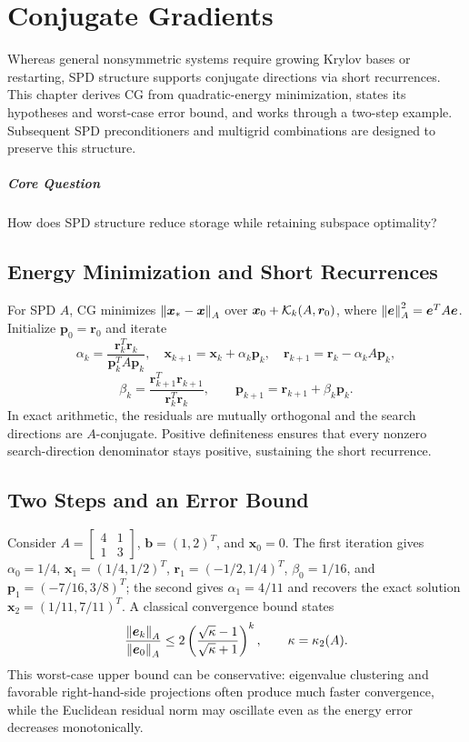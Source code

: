 \chapter{Conjugate Gradients}\label{v0ch:13}
\begin{chaptersummary}
Whereas general nonsymmetric systems require growing Krylov bases or restarting, SPD structure supports conjugate directions via short recurrences. This chapter derives CG from quadratic-energy minimization, states its hypotheses and worst-case error bound, and works through a two-step example. Subsequent SPD preconditioners and multigrid combinations are designed to preserve this structure.
\end{chaptersummary}
\paragraph{Core Question}How does SPD structure reduce storage while retaining subspace optimality?

\section{Energy Minimization and Short Recurrences}
For SPD $A$, CG minimizes
$\left\lVert \bm x_*-\bm x\right\rVert_A$ over $\bm x_0+\mathcal K_k(A,\bm r_0)$, where $\left\lVert \bm e\right\rVert_A^2=\bm e^TA\bm e$.
Initialize $\bm p_0=\bm r_0$ and iterate
\[
 \alpha_k=\frac{\bm r_k^T\bm r_k}{\bm p_k^TA\bm p_k},\quad
 \bm x_{k+1}=\bm x_k+\alpha_k\bm p_k,\quad
 \bm r_{k+1}=\bm r_k-\alpha_kA\bm p_k,
\]
\[
 \beta_k=\frac{\bm r_{k+1}^T\bm r_{k+1}}{\bm r_k^T\bm r_k},\qquad
 \bm p_{k+1}=\bm r_{k+1}+\beta_k\bm p_k.
\]
In exact arithmetic, the residuals are mutually orthogonal and the search directions are $A$-conjugate. Positive definiteness ensures that every nonzero search-direction denominator stays positive, sustaining the short recurrence.
\section{Two Steps and an Error Bound}
Consider $A=\left[\begin{smallmatrix}4&1\\1&3\end{smallmatrix}\right]$,
$\bm b=(1,2)^T$, and $\bm x_0=0$.
The first iteration gives $\alpha_0=1/4$,
$\bm x_1=(1/4,1/2)^T$,
$\bm r_1=(-1/2,1/4)^T$,
$\beta_0=1/16$, and
$\bm p_1=(-7/16,3/8)^T$;
the second gives $\alpha_1=4/11$ and recovers the exact solution
$\bm x_2=(1/11,7/11)^T$.
A classical convergence bound states
\[
 \frac{\left\lVert \bm e_k\right\rVert_A}{\left\lVert \bm e_0\right\rVert_A}
 \le2\left(\frac{\sqrt\kappa-1}{\sqrt\kappa+1}\right)^k,
 \qquad \kappa=\kappa_2(A).
\]
This worst-case upper bound can be conservative: eigenvalue clustering and favorable right-hand-side projections often produce much faster convergence, while the Euclidean residual norm may oscillate even as the energy error decreases monotonically.
